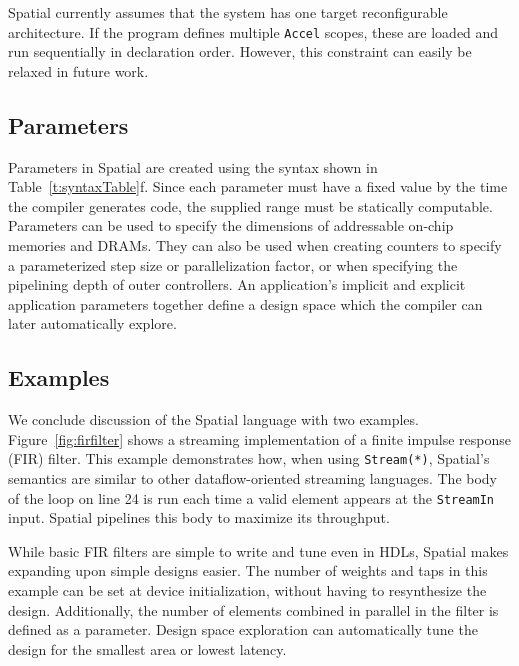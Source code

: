 Spatial currently assumes that the system has one target reconfigurable architecture.
If the program defines multiple \texttt{\small{Accel}} scopes, these are loaded and run sequentially in declaration order. However, this constraint can easily be relaxed in future work.



\subsection{Parameters}
Parameters in Spatial are created using the syntax shown in Table~\ref{t:syntaxTable}f.
Since each parameter must have a fixed value by the time the compiler generates code, the supplied range must be statically computable.
Parameters can be used to specify the dimensions of addressable on-chip memories and DRAMs.
They can also be used when creating counters to specify a parameterized step size or parallelization factor, or when specifying the pipelining depth of outer controllers.
An application's implicit and explicit application parameters together define a design space which the compiler can later automatically explore.

\subsection{Examples}




We conclude discussion of the Spatial language with two examples.
Figure~\ref{fig:firfilter} shows a streaming implementation of a finite impulse response (FIR) filter.
This example demonstrates how, when using \texttt{\small{Stream(*)}}, Spatial's semantics are similar to other dataflow-oriented streaming languages. The body of the loop on line 24 is run each time a valid element appears at the \texttt{\small{StreamIn}} input. Spatial pipelines this body to maximize its throughput.

While basic FIR filters are simple to write and tune even in HDLs, Spatial makes expanding upon simple designs easier. The number of weights and taps in this example can be set at device initialization, without having to resynthesize the design. Additionally, the number of elements combined in parallel in the filter is defined as a parameter. Design space exploration can automatically tune the design for the smallest area or lowest latency.


